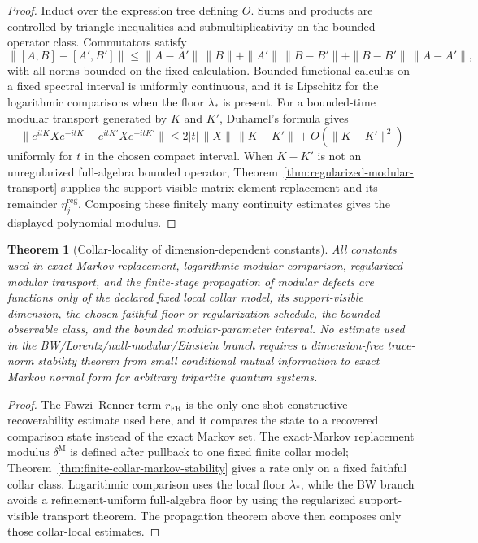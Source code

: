 \documentclass[11pt]{article}
\newtheorem{theorem}{Theorem}[section]
\begin{document}
\begin{proof}
Induct over the expression tree defining \(O\). Sums and products are
controlled by triangle inequalities and submultiplicativity on the bounded
operator class. Commutators satisfy
\[
\|[A,B]-[A',B']\|
\le
\|A-A'\|\,\|B\|+\|A'\|\,\|B-B'\|
+\|B-B'\|\,\|A-A'\|,
\]
with all norms bounded on the fixed calculation. Bounded functional calculus
on a fixed spectral interval is uniformly continuous, and it is Lipschitz for
the logarithmic comparisons when the floor \(\lambda_\ast\) is present. For a
bounded-time modular transport generated by \(K\) and \(K'\), Duhamel's formula
gives
\[
\|e^{itK}Xe^{-itK}-e^{itK'}Xe^{-itK'}\|
\le
2|t|\,\|X\|\,\|K-K'\|+O(\|K-K'\|^2)
\]
uniformly for \(t\) in the chosen compact interval. When \(K-K'\) is not an
unregularized full-algebra bounded operator, Theorem~\ref{thm:regularized-modular-transport}
supplies the support-visible matrix-element replacement and its remainder
\(\eta^{\mathrm{reg}}_j\). Composing these finitely many continuity estimates
gives the displayed polynomial modulus.
\end{proof}

\begin{theorem}[Collar-locality of dimension-dependent constants]\label{thm:dimension-quarantine}
All constants used in exact-Markov replacement, logarithmic modular
comparison, regularized modular transport, and the finite-stage propagation of
modular defects are functions only of the declared fixed local collar model,
its support-visible dimension, the chosen faithful floor or regularization
schedule, the bounded observable class, and the bounded modular-parameter interval.
No estimate used in the BW/Lorentz/null-modular/Einstein branch requires a
dimension-free trace-norm stability theorem from small conditional mutual
information to exact Markov normal form for arbitrary tripartite quantum
systems.
\end{theorem}

\begin{proof}
The Fawzi--Renner term \(r_{\mathrm{FR}}\) is the only one-shot constructive
recoverability estimate used here, and it compares the state to a recovered
comparison state instead of the exact Markov set. The exact-Markov
replacement modulus \(\delta^{\mathrm M}\) is defined after pullback to one
fixed finite collar model; Theorem~\ref{thm:finite-collar-markov-stability}
gives a rate only on a fixed faithful collar class. Logarithmic comparison uses
the local floor \(\lambda_\ast\), while the BW branch avoids a refinement-uniform
full-algebra floor by using the regularized support-visible transport theorem.
The propagation theorem above then composes only those collar-local estimates.
\end{proof}
\end{document}
